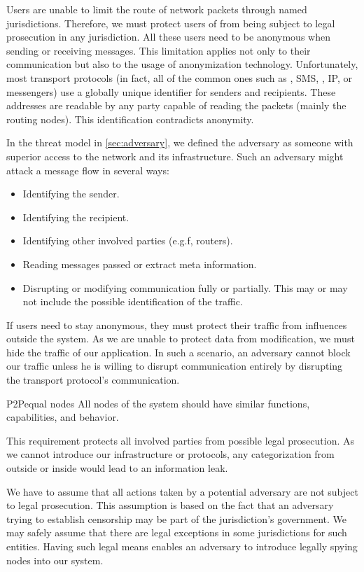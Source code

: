 Users are unable to limit the route of network packets through named jurisdictions. Therefore, we must protect users of \MessageVortex{} from being subject to legal prosecution in any jurisdiction. All these users need to be anonymous when sending or receiving messages. This limitation applies not only to their communication but also to the usage of anonymization technology. Unfortunately, most transport protocols (in fact, all of the common ones such as , SMS, , IP, or messengers) use a globally unique identifier for senders and recipients. These addresses are readable by any party capable of reading the packets (mainly the routing nodes).  This identification contradicts anonymity.

In the threat model in \cref{sec:adversary}, we defined the adversary as someone with superior access to the network and its infrastructure. Such an adversary might attack a message flow in several ways:
\begin{itemize}
	\item Identifying the sender.
	\item Identifying the recipient.
	\item Identifying other involved parties (e.g.f, routers).
	\item Reading messages passed or extract meta information.
	\item Disrupting or modifying communication fully or partially. This may or may not include the possible identification of the traffic.
\end{itemize}

If users need to stay anonymous, they must protect their traffic from influences outside the system. As we are unable to protect data from modification, we must hide the traffic of our application. In such a scenario, an adversary cannot block our traffic unless he is willing to disrupt communication entirely by disrupting the transport protocol's communication. 

\begin{requirement}{P2P}{equal nodes}
	All nodes of the system should have similar functions, capabilities, and behavior.
\end{requirement}

This requirement protects all involved parties from possible legal prosecution. As we cannot introduce our infrastructure or protocols, any categorization from outside or inside would lead to an information leak. 

We have to assume that all actions taken by a potential adversary are not subject to legal prosecution. This assumption is based on the fact that an adversary trying to establish censorship may be part of the jurisdiction's government. We may safely assume that there are legal exceptions in some jurisdictions for such entities. Having such legal means enables an adversary to introduce legally spying nodes into our system.

